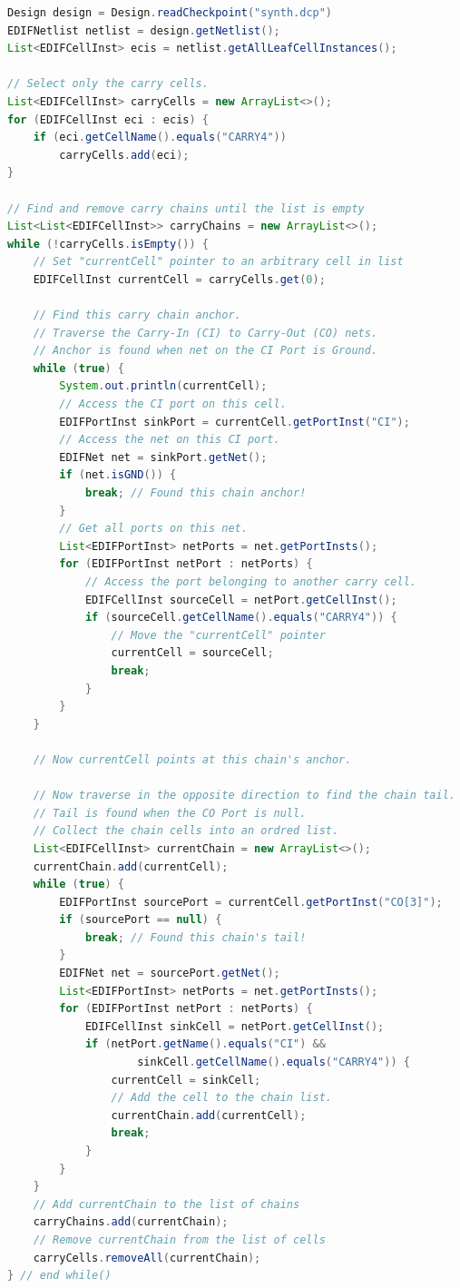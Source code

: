 \begin{multicols}{2}

\begin{lstlisting}[language=java, caption={Finding and storing carry chains.}, label={lst:carry_chains}]
Design design = Design.readCheckpoint("synth.dcp")
EDIFNetlist netlist = design.getNetlist();
List<EDIFCellInst> ecis = netlist.getAllLeafCellInstances();

// Select only the carry cells.
List<EDIFCellInst> carryCells = new ArrayList<>();
for (EDIFCellInst eci : ecis) {
    if (eci.getCellName().equals("CARRY4"))
        carryCells.add(eci);
}

// Find and remove carry chains until the list is empty
List<List<EDIFCellInst>> carryChains = new ArrayList<>();
while (!carryCells.isEmpty()) {
    // Set "currentCell" pointer to an arbitrary cell in list
    EDIFCellInst currentCell = carryCells.get(0);

    // Find this carry chain anchor.
    // Traverse the Carry-In (CI) to Carry-Out (CO) nets.
    // Anchor is found when net on the CI Port is Ground.
    while (true) {
        System.out.println(currentCell);
        // Access the CI port on this cell.
        EDIFPortInst sinkPort = currentCell.getPortInst("CI");
        // Access the net on this CI port.
        EDIFNet net = sinkPort.getNet();
        if (net.isGND()) {
            break; // Found this chain anchor!
        }
        // Get all ports on this net.
        List<EDIFPortInst> netPorts = net.getPortInsts();
        for (EDIFPortInst netPort : netPorts) {
            // Access the port belonging to another carry cell.
            EDIFCellInst sourceCell = netPort.getCellInst();
            if (sourceCell.getCellName().equals("CARRY4")) {
                // Move the "currentCell" pointer
                currentCell = sourceCell;
                break;
            }
        }
    }

    // Now currentCell points at this chain's anchor.

    // Now traverse in the opposite direction to find the chain tail.
    // Tail is found when the CO Port is null.
    // Collect the chain cells into an ordred list.
    List<EDIFCellInst> currentChain = new ArrayList<>();
    currentChain.add(currentCell);
    while (true) {
        EDIFPortInst sourcePort = currentCell.getPortInst("CO[3]");
        if (sourcePort == null) {
            break; // Found this chain's tail!
        }
        EDIFNet net = sourcePort.getNet();
        List<EDIFPortInst> netPorts = net.getPortInsts();
        for (EDIFPortInst netPort : netPorts) {
            EDIFCellInst sinkCell = netPort.getCellInst();
            if (netPort.getName().equals("CI") &&
                    sinkCell.getCellName().equals("CARRY4")) {
                currentCell = sinkCell;
                // Add the cell to the chain list.
                currentChain.add(currentCell);
                break;
            }
        }
    }
    // Add currentChain to the list of chains
    carryChains.add(currentChain);
    // Remove currentChain from the list of cells
    carryCells.removeAll(currentChain);
} // end while()


\end{lstlisting}
\end{multicols}
